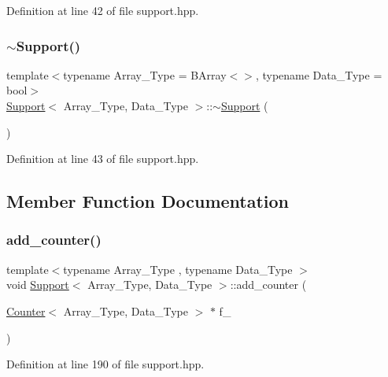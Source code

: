 Definition at line 42 of file support.\+hpp.

\mbox{\label{class_support_a03228371869980fa356b7b86871d94e8}} 
\subsubsection{\texorpdfstring{$\sim$\+Support()}{~Support()}}
{\footnotesize\ttfamily template$<$typename Array\+\_\+\+Type  = B\+Array$<$$>$, typename Data\+\_\+\+Type  = bool$>$ \\
\hyperlink{class_support}{Support}$<$ Array\+\_\+\+Type, Data\+\_\+\+Type $>$\+::$\sim$\hyperlink{class_support}{Support} (\begin{DoxyParamCaption}{ }\end{DoxyParamCaption})\hspace{0.3cm}{\ttfamily [inline]}}



Definition at line 43 of file support.\+hpp.



\subsection{Member Function Documentation}
\mbox{\label{class_support_a0ad8bb6202451253697d771a28859210}} 
\subsubsection{\texorpdfstring{add\+\_\+counter()}{add\_counter()}}
{\footnotesize\ttfamily template$<$typename Array\+\_\+\+Type , typename Data\+\_\+\+Type $>$ \\
void \hyperlink{class_support}{Support}$<$ Array\+\_\+\+Type, Data\+\_\+\+Type $>$\+::add\+\_\+counter (\begin{DoxyParamCaption}\item[{\hyperlink{class_counter}{Counter}$<$ Array\+\_\+\+Type, Data\+\_\+\+Type $>$ $\ast$}]{f\+\_\+ }\end{DoxyParamCaption})\hspace{0.3cm}{\ttfamily [inline]}}



Definition at line 190 of file support.\+hpp.

